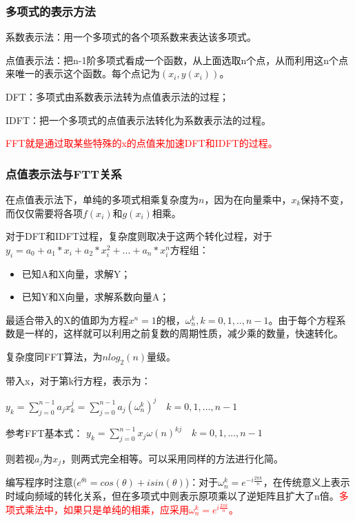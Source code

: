 \documentclass[UTF8]{article}%
\begin{document}
\subsubsection{多项式的表示方法}

系数表示法：用一个多项式的各个项系数来表达该多项式。

点值表示法：把n-1阶多项式看成一个函数，从上面选取n个点，从而利用这n个点来唯一的表示这个函数。每个点记为$(x_i,y(x_i))$。

DFT：多项式由系数表示法转为点值表示法的过程；

IDFT：把一个多项式的点值表示法转化为系数表示法的过程。

\textcolor{red}{FFT就是通过取某些特殊的x的点值来加速DFT和IDFT的过程。}

\subsubsection{点值表示法与FTT关系}

在点值表示法下，单纯的多项式相乘复杂度为$n$，因为在向量乘中，$x_k$保持不变，而仅仅需要将各项$f(x_i)$和$g(x_i)$相乘。

对于DFT和IDFT过程，复杂度则取决于这两个转化过程，对于$y_i=a_0+a_1*x_i+a_2*x_i^2+...+a_n*x_i^n$方程组：

\begin{itemize}
    \item 已知A和X向量，求解Y；
    \item 已知Y和X向量，求解系数向量A；
\end{itemize}

最适合带入的X的值即为方程$x^n=1$的根，$\omega_n^k,k=0,1,..,n-1$。由于每个方程系数是一样的，这样就可以利用之前复数的周期性质，减少乘的数量，快速转化。

复杂度同FFT算法，为$nlog_2(n)$量级。

带入x，对于第k行方程，表示为：

$y_k=\sum_{j = 0}^{n-1} a_jx_k^j = \sum_{j = 0}^{n-1} a_j(\omega_n^k)^j \quad k=0,1,...,n-1$

参考FFT基本式： $y_k=\sum_{j=0}^{n-1} x_j \omega (n)^{kj} \quad k=0,1,...,n-1$

则若视$a_j$为$x_j$，则两式完全相等。可以采用同样的方法进行化简。


编写程序时注意($e^{\theta i}=cos(\theta)+isin(\theta)$)：对于$\omega_n^k=e^{- i \frac{2 \pi k}{n}}$，在传统意义上表示时域向频域的转化关系，但在多项式中则表示原项乘以了逆矩阵且扩大了n倍。\textcolor{red}{多项式乘法中，如果只是单纯的相乘，应采用$\omega_n^k=e^{ i \frac{2 \pi k}{n}}$。}
\end{document}

